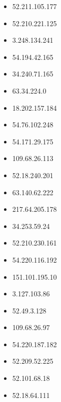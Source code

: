\documentclass{article}
\begin{document}
\begin{itemize}
        \item 52.211.105.177
    
        \item 52.210.221.125
    
        \item 3.248.134.241
    
        \item 54.194.42.165
    
        \item 34.240.71.165
    
        \item 63.34.224.0
    
        \item 18.202.157.184
    
        \item 54.76.102.248
    
        \item 54.171.29.175
    
        \item 109.68.26.113
    
        \item 52.18.240.201
    
        \item 63.140.62.222
    
        \item 217.64.205.178
    
        \item 34.253.59.24
    
        \item 52.210.230.161
    
        \item 54.220.116.192
    
        \item 151.101.195.10
    
        \item 3.127.103.86
    
        \item 52.49.3.128
    
        \item 109.68.26.97
    
        \item 54.220.187.182
    
        \item 52.209.52.225
    
        \item 52.101.68.18
    
        \item 52.18.64.111
    

\end{itemize}
\end{document}
